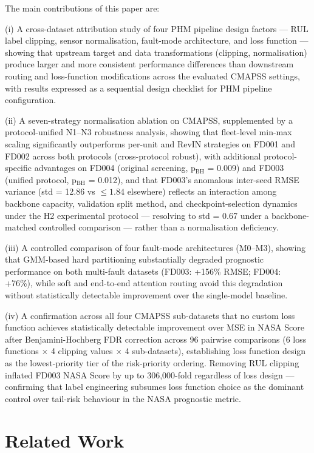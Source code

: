 \documentclass[preprint,10pt]{elsarticle}
\begin{document}
The main contributions of this paper are:

(i) A cross-dataset attribution study of four PHM pipeline design factors --- RUL label clipping, sensor normalisation, fault-mode architecture, and loss function --- showing that upstream target and data transformations (clipping, normalisation) produce larger and more consistent performance differences than downstream routing and loss-function modifications across the evaluated CMAPSS settings, with results expressed as a sequential design checklist for PHM pipeline configuration.

(ii) A seven-strategy normalisation ablation on CMAPSS, supplemented by a protocol-unified N1--N3 robustness analysis, showing that fleet-level min-max scaling significantly outperforms per-unit and RevIN strategies on FD001 and FD002 across both protocols (cross-protocol robust), with additional protocol-specific advantages on FD004 (original screening, p$_\text{BH}$ = 0.009) and FD003 (unified protocol, p$_\text{BH}$ = 0.012), and that FD003's anomalous inter-seed RMSE variance (std = 12.86 vs $\leq\!1.84$ elsewhere) reflects an interaction among backbone capacity, validation split method, and checkpoint-selection dynamics under the H2 experimental protocol --- resolving to std = 0.67 under a backbone-matched controlled comparison --- rather than a normalisation deficiency.

(iii) A controlled comparison of four fault-mode architectures (M0--M3), showing that GMM-based hard partitioning substantially degraded prognostic performance on both multi-fault datasets (FD003: +156\% RMSE; FD004: +76\%), while soft and end-to-end attention routing avoid this degradation without statistically detectable improvement over the single-model baseline.

(iv) A confirmation across all four CMAPSS sub-datasets that no custom loss function achieves statistically detectable improvement over MSE in NASA Score after Benjamini-Hochberg FDR correction across 96 pairwise comparisons (6 loss functions $\times$ 4 clipping values $\times$ 4 sub-datasets), establishing loss function design as the lowest-priority tier of the risk-priority ordering. Removing RUL clipping inflated FD003 NASA Score by up to 306,000-fold regardless of loss design --- confirming that label engineering subsumes loss function choice as the dominant control over tail-risk behaviour in the NASA prognostic metric.

\section{Related Work}
\end{document}
